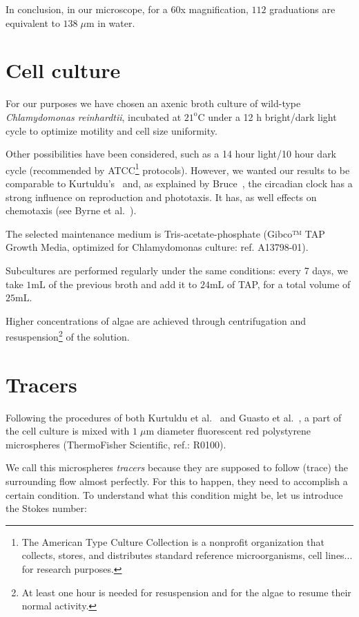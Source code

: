In conclusion, in our microscope, for a 60x magnification, $112$ graduations are equivalent to $138 \; \mu \textrm{m}$ in water.

\section{Cell culture}
\label{mm_culture}

For our purposes we have chosen an axenic broth culture of wild-type \textit{Chlamydomonas reinhardtii}, incubated at $21^\textrm{o} \textrm{C}$ under a 12 h bright/dark light cycle to optimize motility and cell size uniformity.

Other possibilities have been considered, such as a 14 hour light/10 hour dark cycle (recommended by ATCC\footnote{The American Type Culture Collection is a nonprofit organization that collects, stores, and distributes standard reference microorganisms, cell lines... for research purposes.} protocols). However, we wanted our results to be comparable to Kurtuldu's~\cite{Kurtuldu2011} and, as explained by Bruce~\cite{Bruce}, the circadian clock has a strong influence on reproduction and phototaxis. It has, as well effects on chemotaxis (see Byrne et al.~\cite{Byrne}).

The selected maintenance medium is Tris-acetate-phosphate (Gibco™ TAP Growth Media, optimized for Chlamydomonas culture: ref. A13798-01). 

Subcultures are performed regularly under the same conditions: every 7 days, we take $1 \textrm{mL}$ of the previous broth and add it to $24 \textrm{mL}$ of TAP, for a total volume of $25 \textrm{mL}$.

Higher concentrations of algae are achieved through centrifugation and resuspension\footnote{At least one hour is needed for resuspension and for the algae to resume their normal activity.} of the solution.

\section{Tracers}
\label{mm_tracers}

Following the procedures of both Kurtuldu et al.~\cite{Kurtuldu2011} and Guasto et al.~\cite{Guasto}, a part of the cell culture is mixed with $1 \; \mu \textrm{m}$ diameter fluorescent red polystyrene microspheres (ThermoFisher Scientific, ref.: R0100). 

We call this microspheres \textit{tracers} because they are supposed to follow (trace) the surrounding flow almost perfectly. For this to happen, they need to accomplish a certain condition. To understand what this condition might be, let us introduce the Stokes number:

